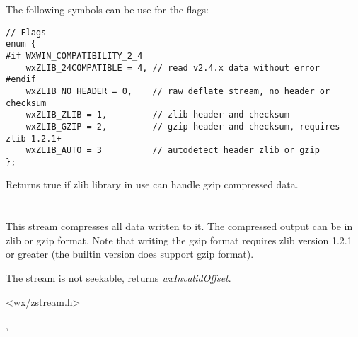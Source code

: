 The following symbols can be use for the flags:

\begin{verbatim}
// Flags
enum {
#if WXWIN_COMPATIBILITY_2_4
    wxZLIB_24COMPATIBLE = 4, // read v2.4.x data without error
#endif
    wxZLIB_NO_HEADER = 0,    // raw deflate stream, no header or checksum
    wxZLIB_ZLIB = 1,         // zlib header and checksum
    wxZLIB_GZIP = 2,         // gzip header and checksum, requires zlib 1.2.1+
    wxZLIB_AUTO = 3          // autodetect header zlib or gzip
};
\end{verbatim}

\label{wxzlibinputstreamcanhandlegzip}


Returns true if zlib library in use can handle gzip compressed data.

\section{}\label{wxzliboutputstream}

This stream compresses all data written to it. The compressed output can be
in zlib or gzip format.
Note that writing the gzip format requires zlib version 1.2.1 or greater
(the builtin version does support gzip format).

The stream is not seekable,  returns
 {\it wxInvalidOffset}.




<wx/zstream.h>


,



\label{wxzliboutputstreamwxzliboutputstream}


